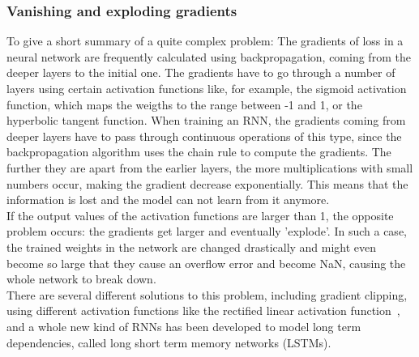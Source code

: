 \documentclass[
a4paper,
pagesize,
pdftex,
12pt,
twoside, %
BCOR=5mm, %
ngerman,
fleqn,
final,
]{scrartcl}
\begin{document}
	\subsubsection{Vanishing and exploding gradients}
	To give a short summary of a quite complex problem: The gradients of loss in a neural network are frequently calculated using backpropagation, coming from the deeper layers to the initial one. The gradients have to go through a number of layers using certain activation functions like, for example, the sigmoid activation function, which maps the weigths to the range between -1 and 1, or the hyperbolic tangent function. When training an RNN, the gradients coming from deeper layers have to pass through continuous operations of this type, since the backpropagation algorithm uses the chain rule to compute the gradients. The further they are apart from the earlier layers, the more multiplications with small numbers occur, making the gradient decrease exponentially. This means that the information is lost and the model can not learn from it anymore.\\
	If the output values of the activation functions are larger than 1, the opposite problem occurs: the gradients get larger and eventually 'explode'. In such a case, the trained weights in the network are changed drastically and might even become so large that they cause an overflow error and become NaN, causing the whole network to break down.\\
	There are several different solutions to this problem, including gradient clipping, using different activation functions like the rectified linear activation function~\cite{Glorot.2011}, and a whole new kind of RNNs has been developed to model long term dependencies, called long short term memory networks (LSTMs).
	
\end{document}
